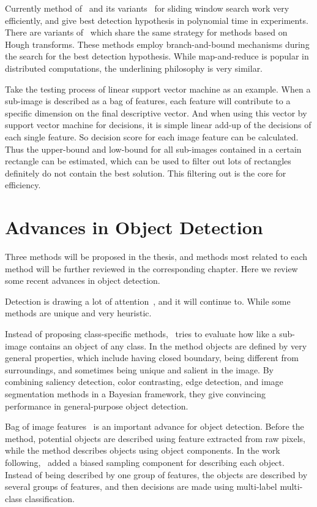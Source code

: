 Currently method of~\citep{ij15} and its variants~\citep{ac1} for sliding window search work very efficiently, and give best detection hypothesis in polynomial time in experiments. There are variants of~\citep{ac27} which share the same strategy for methods based on Hough transforms. These methods employ branch-and-bound mechanisms during the search for the best detection hypothesis. While map-and-reduce is popular in distributed computations, the underlining philosophy is very similar.

Take the testing process of linear support vector machine as an example. When a sub-image is described as a bag of features, each feature will contribute to a specific dimension on the final descriptive vector.
And when using this vector by support vector machine for decisions, it is simple linear add-up of the decisions of each single feature. So decision score for each image feature can be calculated. Thus the upper-bound and low-bound for all sub-images contained in a certain rectangle can be estimated, which can be used to filter out lots of rectangles definitely do not contain the best solution. This filtering out is the core for efficiency.

\section{Advances in Object Detection}

Three methods will be proposed in the thesis, and methods most related to each method will be further reviewed in the corresponding chapter. Here we review some recent advances in object detection.

Detection is drawing a lot of attention~\citep{ij4,ac31,ac30,ac4,ac32,ac29,ac28,ac1,ac9,ac2,ac3,ac22,lb1,ac5,ac10,ac21,ac18}, and it will continue to. While some methods are unique and very heuristic.

Instead of proposing class-specific methods,~\citep{wiao} tries to evaluate how like a sub-image contains an object of any class. In the method objects are defined by very general properties, which include having closed boundary, being different from surroundings, and sometimes being unique and salient in the image. By combining saliency detection, color contrasting, edge detection, and image segmentation methods in a Bayesian framework, they give convincing performance in general-purpose object detection.

Bag of image features~\citep{bgf} is an important advance for object detection. Before the method, potential objects are described using feature extracted from raw pixels, while the method describes objects using object components. In the work following,~\citep{ij13} added a biased sampling component for describing each object. Instead of being described by one group of features, the objects are described by several groups of features, and then decisions are made using multi-label multi-class classification.

